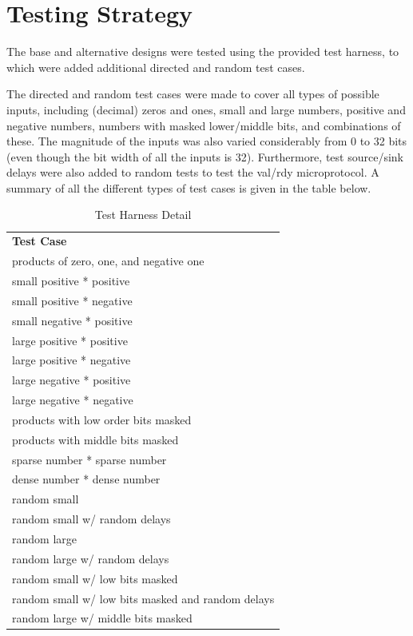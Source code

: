\documentclass[10pt]{article}
\begin{document}
\section{Testing Strategy}

The base and alternative designs were tested using the provided test harness, to which were added additional directed and random test cases.

The directed and random test cases were made to cover all types of possible inputs, including (decimal) zeros and ones, small and large numbers, positive and negative numbers, numbers with masked lower/middle bits, and combinations of these. The magnitude of the inputs was also varied considerably from 0 to 32 bits (even though the bit width of all the inputs is 32). Furthermore, test source/sink delays were also added to random tests to test the val/rdy microprotocol. A summary of all the different types of test cases is given in the table below.
\begin{table}[h]
\begin{tabular}{l}
\textbf{Test Case}                                \\
products of zero, one, and negative one           \\
small positive * positive                         \\
small positive * negative                         \\
small negative * positive                         \\
large positive * positive                         \\
large positive * negative                         \\
large negative * positive                         \\
large negative * negative                         \\
products with low order bits masked               \\
products with middle bits masked                  \\
sparse number * sparse number                     \\
dense number * dense number                       \\
random small                                      \\
random small w/ random delays                     \\
random large                                      \\
random large w/ random delays                     \\
random small w/ low bits masked                   \\
random small w/ low bits masked and random delays \\
random large w/ middle bits masked                \\
                                                 
\end{tabular}
\caption{Test Harness Detail}
\end{table}
\end{document}
